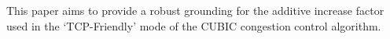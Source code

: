 
This paper aims to provide a robust grounding for the additive increase factor used in the `TCP-Friendly' mode of the CUBIC congestion control algorithm.